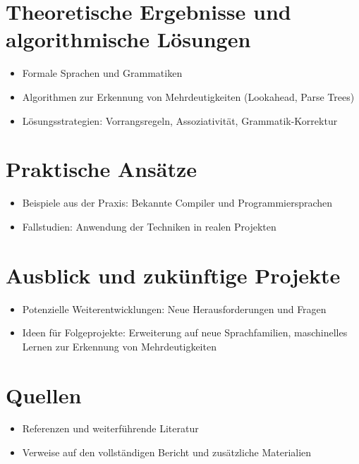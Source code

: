 \documentclass[t]{beamer}
\begin{document}
\section{Theoretische Ergebnisse und algorithmische Lösungen}\label{sec:theoretische-ergebnisse-und-algorithmische-losungen}
\begin{frame}
\begin{itemize}
    \item Formale Sprachen und Grammatiken
    \item Algorithmen zur Erkennung von Mehrdeutigkeiten (Lookahead, Parse Trees)
    \item Lösungsstrategien: Vorrangsregeln, Assoziativität, Grammatik-Korrektur
\end{itemize}
\end{frame}

\section{Praktische Ansätze}\label{sec:praktische-ansatze}
\begin{frame}
\begin{itemize}
    \item Beispiele aus der Praxis: Bekannte Compiler und Programmiersprachen
    \item Fallstudien: Anwendung der Techniken in realen Projekten
\end{itemize}
\end{frame}

\section{Ausblick und zukünftige Projekte}\label{sec:ausblick-und-zukunftige-projekte}
\begin{frame}
\begin{itemize}
    \item Potenzielle Weiterentwicklungen: Neue Herausforderungen und Fragen
    \item Ideen für Folgeprojekte: Erweiterung auf neue Sprachfamilien, maschinelles Lernen zur Erkennung von Mehrdeutigkeiten
\end{itemize}
\end{frame}

\section{Quellen}\label{sec:quellen}
\begin{frame}
\begin{itemize}
    \item Referenzen und weiterführende Literatur
    \item Verweise auf den vollständigen Bericht und zusätzliche Materialien
\end{itemize}
\end{frame}
\end{document}

